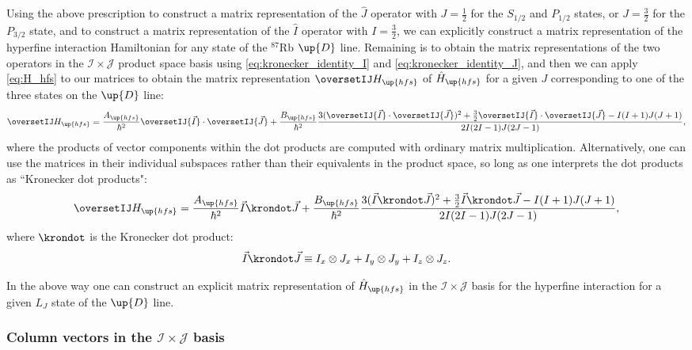 Using the above prescription to construct a matrix representation of the $\hat J$ operator with $J=\frac12$ for the $S_{1/2}$ and $P_{1/2}$ states, or $J=\frac32$ for the $P_{3/2}$ state, and to construct a matrix representation of the $\hat I$ operator with $I=\frac32$, we can explicitly construct a matrix representation of the hyperfine interaction Hamiltonian for any state of the $^{87}$Rb $\up{D}$ line. Remaining is to obtain the matrix representations of the two operators in the $\mathcal{I}\times\mathcal{J}$ product space basis using \eqref{eq:kronecker_identity_I} and \eqref{eq:kronecker_identity_J}, and then we can apply \eqref{eq:H_hfs} to our matrices to obtain the matrix representation $\oversetIJ H_\up{hfs}$ of $\hat H_\up{hfs}$ for a given $J$ corresponding to one of the three states on the $\up{D}$ line:
\begin{align}\label{eq:H_hfs_matrix}
\oversetIJ H_\up{hfs} = \frac{A_\up{hfs}}{\hbar^2}
\oversetIJ{\vec I} \cdot
\oversetIJ{\vec J}
+ \frac{B_\up{hfs}}{\hbar^2}\frac
{3(\oversetIJ{\vec I}\cdot
\oversetIJ{\vec J})^2
+ \frac32 \oversetIJ{\vec I}\cdot
\oversetIJ{\vec J}
 - I(I + 1)J(J + 1)}
{2I(2I - 1)J(2J - 1)},
\end{align}
where the products of vector components within the dot products are computed with ordinary matrix multiplication. Alternatively, one can use the matrices in their individual subspaces rather than their equivalents in the product space, so long as one interprets the dot products as ``Kronecker dot products":
\begin{align}\label{eq:H_hfs_matrix_kron}
\oversetIJ H_\up{hfs} = \frac{A_\up{hfs}}{\hbar^2}
\vec I \krondot \vec J
+ \frac{B_\up{hfs}}{\hbar^2}\frac
{3(\vec I \krondot \vec J)^2
+ \frac32 \vec I \krondot \vec J
 - I(I + 1)J(J + 1)}
{2I(2I - 1)J(2J - 1)},
\end{align}
where $\krondot$ is the Kronecker dot product:
\begin{align}
\vec I \krondot \vec J \equiv I_x \otimes J_x + I_y \otimes J_y + I_z \otimes J_z.
\end{align}

In the above way one can construct an explicit matrix representation of $\hat H_\up{hfs}$ in the $\mathcal{I} \times \mathcal{J}$ basis for the hyperfine interaction for a given $L_J$ state of the $\up{D}$ line.

\subsubsection{Column vectors in the $\mathcal{I}\times\mathcal{J}$ basis}

